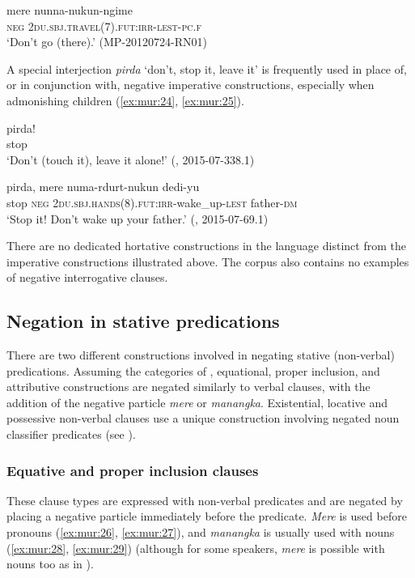\documentclass[output=paper,colorlinks,citecolor=brown]{langscibook}
\begin{document}
\ea\label{ex:mur:23}
    \gll mere nunna-nukun-ngime \\
         \textsc{neg} \textsc{2du.sbj.travel(7).fut:irr-lest-pc.f}\\
    \glt ‘Don’t go (there).’ (MP-20120724-RN01)
\z 

A special interjection \textit{pirda} ‘don’t, stop it, leave it’ is frequently used in place of, or in conjunction with, negative imperative constructions, especially when admonishing children (\ref{ex:mur:24}, \ref{ex:mur:25}). 

\ea\label{ex:mur:24}
    \gll pirda! \\
         stop\\
    \glt ‘Don’t (touch it), leave it alone!’ (\citealt{MansfieldEtAl2019}, 2015-07-338.1)
\z 

\ea\label{ex:mur:25} 
    \gll pirda, mere numa-rdurt-nukun dedi-yu\\
          stop \textsc{neg} \textsc{2du.sbj.hands(8).fut:irr}{}-wake\_up-\textsc{lest} father-\textsc{dm} \\
    \glt ‘Stop it! Don’t wake up your father.’ (\citealt{MansfieldEtAl2019}, 2015-07-69.1)
\z 
         
There are no dedicated hortative constructions in the language distinct from the imperative constructions illustrated above. The corpus also contains no examples of negative interrogative clauses. 

\subsection{Negation in stative predications} \label{sec:mur:2.3}

There are two different constructions involved in negating stative (non-verbal) predications. Assuming the categories of \citet[111ff]{Payne1997}, equational, proper inclusion, and attributive constructions are negated similarly to verbal clauses, with the addition of the negative particle \textit{mere} or \textit{manangka}. Existential, locative and possessive non-verbal clauses use a unique construction involving negated noun classifier predicates (see ).

\subsubsection{Equative and proper inclusion clauses} \label{sec:mur:2.3.1}

These clause types are expressed with non-verbal predicates and are negated by placing a negative particle immediately before the predicate. \textit{Mere} is used before pronouns (\ref{ex:mur:26}, \ref{ex:mur:27}), and \textit{manangka} is usually used with nouns (\ref{ex:mur:28}, \ref{ex:mur:29}) (although for some speakers, \textit{mere} is possible with nouns too as in ).
\end{document}
